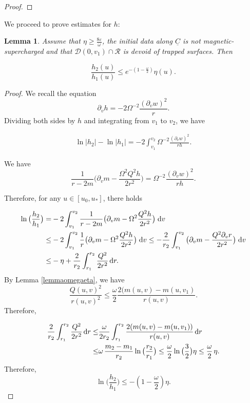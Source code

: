 \documentclass{article}[11pt]
\newcommand{\hsp}{\hspace{.5mm}}
\newcommand{\Cbar}{\underline{C}}
\newcommand{\be}{\begin{equation}}
\newcommand{\ee}{\end{equation}}
\newcommand{\dv}{\hspace{1mm}\text{d}v}
\newtheorem{lemma}{Lemma}[section]
\numberwithin{equation}{section}
\begin{document}
\begin{proof}
\end{proof}

\noindent We proceed to prove estimates for $h$:

\begin{lemma} \label{hlemma}
Assume that $\eta \geq \frac{8 \varepsilon}{\omega}$, the initial data along $\Cbar$ is not magnetic-supercharged and that $\mathcal{D}(0,v_1)\cap \mathcal{R}$ is devoid of trapped surfaces. Then

\[ \frac{h_2(u)}{h_1(u)}\leq e^{-(1-\frac{\omega}{2})}\eta(u).      \]
\end{lemma}

\begin{proof}
We recall the equation \[\partial_{v} h = - 2\Omega^{-2}\frac{(\partial_v w)^2}{r}.\] Dividing both sides by $h$ and integrating from $v_1$ to $v_2$, we have

\begin{align}
\ln \lvert h_2 \rvert - \ln \lvert h_1 \rvert = - 2\int_{v_1}^{v_2} \Omega^{-2} \frac{(\partial_v w)^2}{rh}. \end{align}

We have \be \frac{1}{r-2m}\big(\partial_v m - \frac{\Omega^2 Q^2 h}{2r^2}\big) = \Omega^{-2} \frac{(\partial_v w)^2}{r h}.  \ee

Therefore, for any $u \in [u_0, u_*]$, there holds

\begin{align}
\ln\big( \frac{h_2}{h_1}\big) =& -2 \int_{v_1}^{v_2} \frac{1}{r-2m}\big(\partial_v m - \Omega^2 \frac{Q^2 h}{2r^2}\big) \dv \notag \\ \leq& -2 \int_{v_1}^{v_2}\frac{1}{r}\big(\partial_v m - \Omega^2 \frac{ Q^2 h}{2r^2}\big) \dv \leq - \frac{2}{r_2} \int_{v_1}^{v_2} \big( \partial_v m - \frac{Q^2 \partial_v r}{2r^2}\big) \dv \notag \\ \leq& -\eta + \frac{2}{r_2} \int_{r_1}^{r_2}\frac{Q^2}{2r^2} \hspace{.5mm} \text{d}r. 
\end{align}By Lemma \ref{lemmaomegaeta}, we have \[  \frac{Q(u,v)^2}{r(u,v)^2}\leq \frac{\omega}{2} \frac{2(m(u,v)-m(u,v_1)}{r(u,v)}.    \]Therefore, 

\begin{align}
\frac{2}{r_2} \int_{r_1}^{r_2}\frac{Q^2}{2r^2} \hspace{.5mm} \text{d}r \leq& \frac{\omega}{2r_2}\int_{r_1}^{r_2} \frac{2(m(u,v)-m(u,v_1))}{r(u,v)}\hspace{.5mm}\text{d}r \notag \\ \leq& \omega \hsp \frac{m_2-m_1}{r_2} \ln\big(\frac{r_2}{r_1}\big) \leq \frac{\omega}{2} \ln\big(\frac{3}{2}\big) \eta \leq \frac{\omega}{2}\hsp  \eta. 
\end{align}Therefore, \[ \ln\big(\frac{h_2}{h_1}\big) \leq -(1-\frac{\omega}{2})\eta.   \]
\end{proof}
\end{document}
